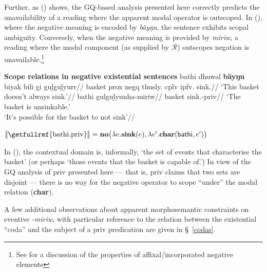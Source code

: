 	
Further, as (\nextx) shows, the \acrshort{GQ}-based analysis presented here correctly predicts the unavailability of a reading where the apparent modal operator is outscoped. In (), where the negative meaning is encoded by \textit{bäyŋu}, the sentence exhibits scopal ambiguity. Conversely, when the negative meaning is provided by \textit{\textdblhyphen miriw}, a reading where the modal component (as supplied by $ \mathcal R $) outscopes negation is unavailable.\footnote{See \citet[Ch. 5]{Horn2001} for a discussion of the properties of affixal/incorporated negative elements} 
	
	
	\pex \textbf{Scope relations in negative existential sentences} \trailingcitation{[AW~20190501]}
	\a\begingl\gla bathi dhuwal \textbf{bäyŋu} biyak bili gi guḻguḻyurr//
	\glb basket \gls{prox} \gls{negq} thusly.\II{} \gls{cplv} \gls{ipfv}.\II{} sink.\II{}//
	\glft`This basket doesn't always sink.'//\endgl
	\a\begingl\gla bathi gulguḻyunha-miriw//
	\glb  basket sink.\IV-\gls{priv}//
	\glft `The basket is unsinkable.'\trailingcitation{$ \neg\gg\lozenge$} \\
	\ljudge{$ ^\# $}`It's possible for the basket to not sink'\trailingcitation{$ *\lozenge\gg\neg $}//\endgl{}
	
	$ \denote{\textup{\getfullref{bathi.priv}}}=\textbf{no}\big(\lambda e.\textbf{sink}(e),\lambda e'.\textbf{char}(\mathsf{bathi},e')\big) $
	
	\xe%
	
In (), the contextual domain is, informally, `the set of events that characterise the basket' (or perhaps `those events that the basket is capable of.') In view of the \acrshort{GQ} analysis of \gls{priv} presented here --- that is, \gls{priv} claims that two sets are disjoint --- there is no way for the negative operator to scope ``under'' the modal relation (\textbf{char}).


A few additional observations about apparent morphosemantic constraints on eventive \textit{-miriw}, with particular reference to the relation between the existential ``coda'' and the subject of a \gls{priv} predication are given in \S~\ref{codas}.

